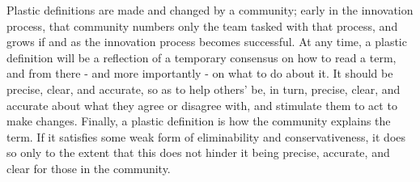 Plastic definitions are made and changed by a community; early in the innovation process, that community numbers only the team tasked with that process, and grows if and as the innovation process becomes successful. At any time, a plastic definition will be a reflection of a temporary consensus on how to read a term, and from there - and more importantly - on what to do about it. It should be precise, clear, and accurate, so as to help others' be, in turn, precise, clear, and accurate about what they agree or disagree with, and stimulate them to act to make changes. Finally, a plastic definition is how the community explains the term. If it satisfies some weak form of eliminability and conservativeness, it does so only to the extent that this does not hinder it being precise, accurate, and clear for those in the community.


\printbibliography